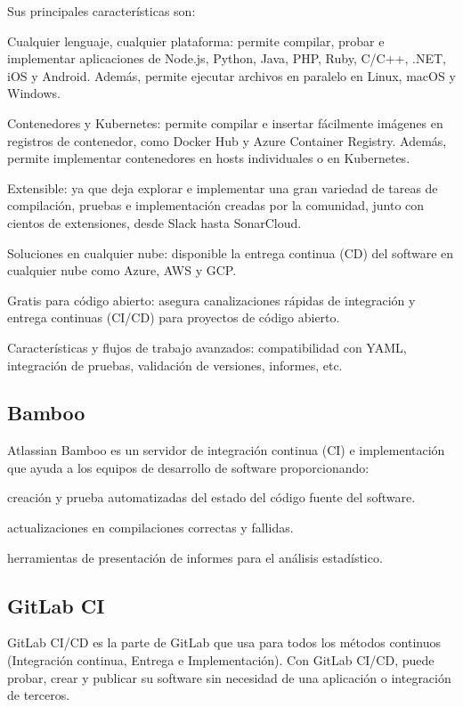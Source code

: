 Sus principales características son:
\begin{compactitem}
    \item Cualquier lenguaje, cualquier plataforma: permite compilar, probar e implementar aplicaciones de Node.js, Python, Java, PHP, Ruby, C/C++, .NET, iOS y Android. Además, permite ejecutar archivos en paralelo en Linux, macOS y Windows.
    \item Contenedores y Kubernetes: permite compilar e insertar fácilmente imágenes en registros de contenedor, como Docker Hub y Azure Container Registry. Además, permite implementar contenedores en hosts individuales o en Kubernetes.
    \item Extensible: ya que deja explorar e implementar una gran variedad de tareas de compilación, pruebas e implementación creadas por la comunidad, junto con cientos de extensiones, desde Slack hasta SonarCloud.
    \item Soluciones en cualquier nube: disponible la entrega continua (CD) del software en cualquier nube como Azure, AWS y GCP.
    \item Gratis para código abierto: asegura canalizaciones rápidas de integración y entrega continuas (CI/CD) para proyectos de código abierto.
    \item Características y flujos de trabajo avanzados: compatibilidad con YAML, integración de pruebas, validación de versiones, informes, etc.
\end{compactitem}

\subsection{Bamboo}
Atlassian Bamboo es un servidor de integración continua (CI) e implementación que ayuda a los equipos de desarrollo de software proporcionando:
\begin{compactitem}
    \item creación y prueba automatizadas del estado del código fuente del software.
    \item actualizaciones en compilaciones correctas y fallidas.
    \item herramientas de presentación de informes para el análisis estadístico.
\end{compactitem}

\subsection{GitLab CI}
GitLab CI/CD es la parte de GitLab que usa para todos los métodos continuos (Integración continua, Entrega e Implementación). Con GitLab CI/CD, puede probar, crear y publicar su software sin necesidad de una aplicación o integración de terceros.

